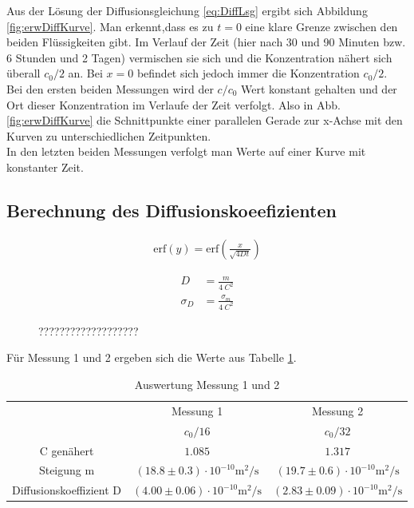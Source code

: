 \documentclass[12pt,a4paper,titlepage,headinclude,bibtotoc]{scrartcl}
\newcommand{\erf}{\ensuremath{\text{erf}}}
\begin{document}
Aus der Lösung der Diffusionsgleichung \eqref{eq:DiffLsg} ergibt sich Abbildung \ref{fig:erwDiffKurve}.
Man erkennt,dass es zu $t=0$ eine klare Grenze zwischen den beiden Flüssigkeiten gibt.
Im Verlauf der Zeit (hier nach 30 und 90 Minuten bzw. 6 Stunden und 2 Tagen) vermischen sie sich und die Konzentration nähert sich überall $c_0/2$ an.
Bei $x=0$ befindet sich jedoch immer die Konzentration $c_0/2$.\\
Bei den ersten beiden Messungen wird der $c/c_0$ Wert konstant gehalten und der Ort dieser Konzentration im Verlaufe der Zeit verfolgt.
Also in Abb. \ref{fig:erwDiffKurve} die Schnittpunkte einer parallelen Gerade zur x-Achse mit den Kurven zu unterschiedlichen Zeitpunkten.\\
In den letzten beiden Messungen verfolgt man Werte auf einer Kurve mit konstanter Zeit.

\subsection{Berechnung des Diffusionskoeefizienten}
\begin{align}
	\erf(y)=\erf\left(\frac{x}{\sqrt{4Dt}}\right)
\end{align}

\begin{align}
	D&=\frac{m}{4~C^2}\\
	\sigma_D&=\frac{\sigma_m}{4~C^2}
\end{align}

\begin{figure}
	
	\caption{???????????????????}
	\label{fig:mess12}
\end{figure}

Für Messung 1 und 2 ergeben sich die Werte aus Tabelle \ref{tab:ausw12}.
\begin{table}[!htb]
\centering
\begin{tabular}{|c|c|c|}
	\hline		
	& Messung 1 & Messung 2 \\
	& $c_0/16$ & $c_0/32$ \\
	\hline
	\hline
	C genähert \footnotemark & $1.085$ & $1.317$ \\	
	
	Steigung m & 
	$(18.8 \pm 0.3) \cdot 10^{-10}\si{\meter ^2 / \second}$ & 
	$(19.7 \pm 0.6) \cdot 10^{-10} \si{ \meter ^2 / \second}$ \\	
	
	Diffusionskoeffizient D &
	$(4.00 \pm 0.06) \cdot 10^{-10}\si{\meter ^2 / \second}$ & 
	$(2.83 \pm 0.09) \cdot 10^{-10} \si{ \meter ^2 / \second}$ \\	
	\hline		
\end{tabular}
\caption{Auswertung Messung 1 und 2}
\label{tab:ausw12}
\end{table}
\end{document}
